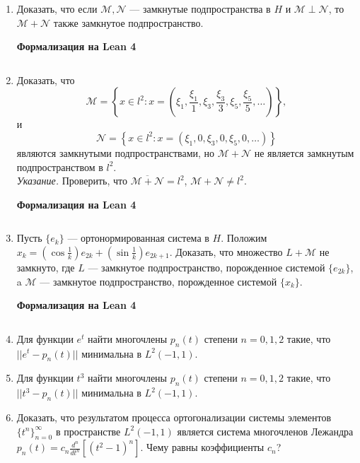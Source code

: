 \documentclass[12pt,a4paper]{article}
\begin{document}
\begin{enumerate}
\begin{center}\small\textbf{Формализация на Lean 4}\end{center}
\inputminted{lean}{FunAn/Section12_HilbertSpaces/Task06.lean}

\newpage
\item Доказать, что если $\mathcal{M}, \mathcal{N}$ — замкнутые подпространства в $H$ и $\mathcal{M}\perp\mathcal{N}$, то $\mathcal{M}+\mathcal{N}$ также замкнутое подпространство.

\begin{center}\small\textbf{Формализация на Lean 4}\end{center}
\inputminted{lean}{FunAn/Section12_HilbertSpaces/Task07.lean}

\newpage
\item Доказать, что
$$\mathcal{M}=\left\{x\in l^{2}:x=\left(\xi_{1},\frac{\xi_{1}}{1},\xi_{3},\frac{\xi_{3}}{3},\xi_{5},\frac{\xi_{5}}{5},\dots\right)\right\},$$
и
$$\mathcal{N}=\left\{x\in l^{2}:x=(\xi_{1},0,\xi_{3},0,\xi_{5},0,\dots)\right\}$$
являются замкнутыми подпространствами, но $\mathcal{M}+\mathcal{N}$ не является замкнутым подпространством в $l^{2}$.\\
\textit{Указание.} Проверить, что $\overline{\mathcal{M}+\mathcal{N}}=l^{2}$, $\mathcal{M}+\mathcal{N}\ne l^{2}$.

\begin{center}\small\textbf{Формализация на Lean 4}\end{center}
\inputminted{lean}{FunAn/Section12_HilbertSpaces/Task08.lean}

\newpage
\item Пусть $\{e_{k}\}$ — ортонормированная система в $H$. Положим $x_{k}=(\cos\frac{1}{k})e_{2k}+(\sin\frac{1}{k})e_{2k+1}$. Доказать, что множество $L+\mathcal{M}$ не замкнуто, где $L$ — замкнутое подпространство, порожденное системой $\{e_{2k}\}$, a $\mathcal{M}$ — замкнутое подпространство, порожденное системой $\{x_{k}\}$.

\begin{center}\small\textbf{Формализация на Lean 4}\end{center}
\inputminted{lean}{FunAn/Section12_HilbertSpaces/Task09.lean}

\newpage

\item Для функции $e^{t}$ найти многочлены $p_{n}(t)$ степени $n=0,1,2$ такие, что $||e^{t}-p_{n}(t)||$ минимальна в $L^{2}(-1,1)$.
\item Для функции $t^{3}$ найти многочлены $p_{n}(t)$ степени $n=0,1,2$ такие, что $||t^{3}-p_{n}(t)||$ минимальна в $L^{2}(-1,1)$.
\newpage
\item Доказать, что результатом процесса ортогонализации системы элементов $\{t^{n}\}_{n=0}^{\infty}$ в пространстве $L^{2}(-1,1)$ является система многочленов Лежандра $p_{n}(t)=c_{n}\frac{d^{n}}{dt^{n}}[(t^{2}-1)^{n}]$. Чему равны коэффициенты $c_{n}$?


\end{enumerate}
\end{document}
